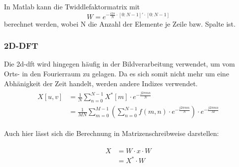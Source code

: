 In Matlab kann die Twiddlefaktormatrix mit
\begin{equation}\label{eq:matlab_dft_faktoren}
 W = e^{-\frac{i 2 \pi}{N}\cdot[0:N-1]'\cdot[0:N-1]}
\end{equation}
berechnet werden, wobei N die Anzahl der Elemente je Zeile bzw. Spalte ist.


\subsubsection{2D-DFT}
Die \gls{2d-dft} wird hingegen häufig in der Bildverarbeitung verwendet, um vom Orts- in den Fourierraum zu gelagen. Da es sich somit nicht mehr um eine Abhänigkeit 
der Zeit handelt, werden andere Indizes verwendet.
\begin{align}
\begin{split}
X[u,v] 	&= \frac{1}{N} \sum^{N-1}_{n=0} X^* \left[ m \right] \cdot e^{-\frac{j 2 \pi m n}{N}}\\
	&= \frac{1}{MN} \sum^{M-1}_{m=0} \left( \sum^{N-1}_{n=0} f(m,n) \cdot e^{-\frac{j 2 \pi m n}{N}} \right) \cdot e^{-\frac{j 2 \pi m n}{M}}
\end{split}
\end{align}

Auch hier lässt sich die Berechnung in Matrizenschreibweise darstellen:

\begin{align}
\begin{split}\label{eq:2D-DFT_MatrixMult}
 X &= W \cdot x \cdot W \\
                    &= X^* \cdot W
\end{split}
\end{align}

